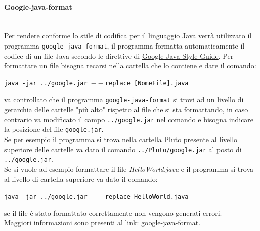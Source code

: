 \paragraph{Google-java-format}\mbox{}\\
Per rendere conforme lo stile di codifica per il linguaggio Java verrà utilizzato il programma \texttt{google-java-format}, il programma formatta automaticamente il codice di un file Java secondo le direttive di \href{https://google.github.io/styleguide/javaguide.html}{Google Java Style Guide}.
Per formattare un file bisogna recarsi nella cartella che lo contiene e  dare il comando: 
\begin{center}
	 \texttt{java -jar ../google.jar $--$replace [NomeFile].java}
\end{center}
va controllato che il programma \texttt{google-java-format} si trovi ad un livello di gerarchia delle cartelle "più alto" rispetto al file che si sta formattando, in caso contrario va modificato il campo \texttt{../google.jar} nel comando e bisogna indicare la posizione del file \texttt{google.jar}. \\
Se per esempio il programma si trova nella cartella Pluto presente al livello superiore delle cartelle va dato il comando \texttt{../Pluto/google.jar} al posto di \texttt{../google.jar}.\\
Se si vuole ad esempio formattare il file \textit{HelloWorld.java} e il programma si trova al livello di cartella superiore va dato il comando: 
\begin{center}
\texttt{java -jar ../google.jar $--$replace HelloWorld.java}
\end{center}
se il file è stato formattato correttamente non vengono generati errori.\\
Maggiori informazioni sono presenti al link: \href{https://github.com/google/google-java-format}{google-java-format}.

